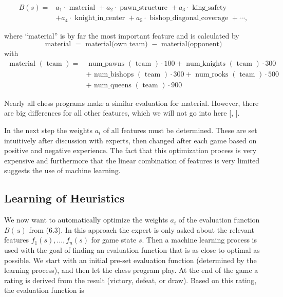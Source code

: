 \documentclass[10pt]{book}
\begin{document}
\begin{align*}
B(s)= & a_{1} \cdot \text { material }+a_{2} \cdot \text { pawn\_structure }+a_{3} \cdot \text { king\_safety } \\
& +a_{4} \cdot \text { knight\_in\_center }+a_{5} \cdot \text { bishop\_diagonal\_coverage }+\cdots, \tag{6.3}
\end{align*}

where ``material'' is by far the most important feature and is calculated by
$$
\text { material }=\text { material(own\_team) }- \text { material(opponent) }
$$
with
$$
\begin{aligned}
\text { material }(\text { team })= & \text { num\_pawns }(\text { team }) \cdot 100+\text { num\_knights }(\text { team }) \cdot 300 \\
& + \text { num\_bishops }(\text { team }) \cdot 300+\text { num\_rooks }(\text { team }) \cdot 500 \\
& + \text { num\_queens }(\text { team }) \cdot 900
\end{aligned}
$$

Nearly all chess programs make a similar evaluation for material. However, there are big differences for all other features, which we will not go into here [\cite{frayn2005chess}, \cite{laramee2000chess}].

In the next step the weights $a_{i}$ of all features must be determined. These are set intuitively after discussion with experts, then changed after each game based on positive and negative experience. The fact that this optimization process is very expensive and furthermore that the linear combination of features is very limited suggests the use of machine learning.

\subsection{Learning of Heuristics}
We now want to automatically optimize the weights $a_{i}$ of the evaluation function $B(\mathrm{~s})$ from (6.3). In this approach the expert is only asked about the relevant features $f_{1}(s), \ldots, f_{n}(s)$ for game state $s$. Then a machine learning process is used with the goal of finding an evaluation function that is as close to optimal as possible. We start with an initial pre-set evaluation function (determined by the learning process), and then let the chess program play. At the end of the game a rating is derived from the result (victory, defeat, or draw). Based on this rating, the evaluation function is
\end{document}
